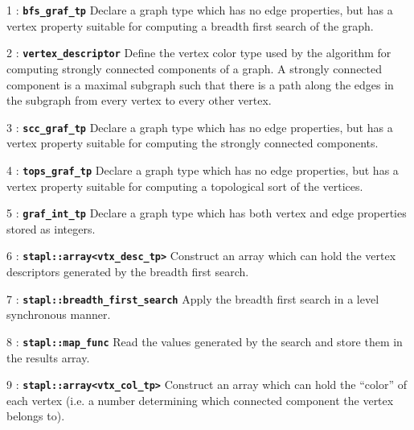 \documentclass{report}
\begin{document}
\begin{hashitemize}
\item 1 : \texttt{{\bf bfs\_graf\_tp}}
\newline
Declare a graph type which has no edge properties, but has a vertex property
suitable for computing a breadth first search of the graph.

\item 2 : \texttt{{\bf vertex\_descriptor}} \newline Define the vertex color
type used by the algorithm for computing strongly connected components of a
graph. A strongly connected component is a maximal subgraph such that there is a
path along the edges in the subgraph from every vertex to every other vertex.

\item 3 : \texttt{{\bf scc\_graf\_tp}}
\newline
Declare a graph type which has no edge properties, but has a vertex property
suitable for computing the strongly connected components.

\item 4 : \texttt{{\bf tops\_graf\_tp}}
\newline
Declare a graph type which has no edge properties, but has a vertex property
suitable for computing a topological sort of the vertices.

\item 5 : \texttt{{\bf graf\_int\_tp}}
\newline
Declare a graph type which has both vertex and edge properties stored
as integers.

\item 6 : \texttt{{\bf stapl::array<vtx\_desc\_tp>}}
\newline
Construct an array which can hold the vertex descriptors generated
by the breadth first search.

\item 7 : \texttt{{\bf stapl::breadth\_first\_search}}
\newline
Apply the breadth first search in a level synchronous manner.

\item 8 : \texttt{{\bf stapl::map\_func}}
\newline
Read the values generated by the search and store them in the
results array.

\item 9 : \texttt{{\bf stapl::array<vtx\_col\_tp>}}
\newline
Construct an array which can hold the ``color'' of each vertex (i.e. a number 
determining which connected component the vertex belongs to).


\end{hashitemize}
\end{document}
